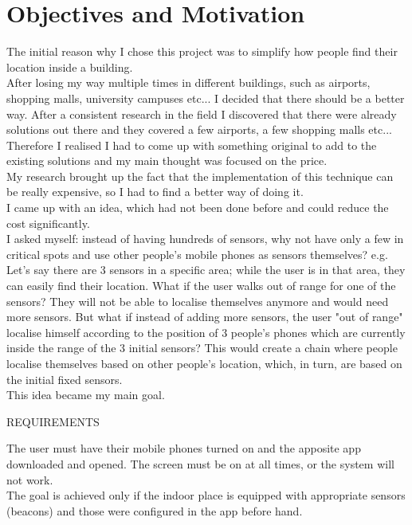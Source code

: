 \chapter{Objectives and Motivation}

The initial reason why I chose this project was to simplify how people find their location inside a building.\\
After losing my way multiple times in different buildings, such as airports, shopping malls, university campuses etc... I decided that there should be a better way. After a consistent research in the field I discovered that there were already solutions out there and they covered a few airports, a few shopping malls etc... Therefore I realised I had to come up with something original to add to the existing solutions and my main thought was focused on the price.\\
My research brought up the fact that the implementation of this technique can be really expensive, so I had to find a better way of doing it.\\
I came up with an idea, which had not been done before and could reduce the cost significantly.\\
I asked myself: instead of having hundreds of sensors, why not have only a few in critical spots and use other people's mobile phones as sensors themselves? e.g. Let's say there are 3 sensors in a specific area; while the user is in that area, they can easily find their location. What if the user walks out of range for one of the sensors? They will not be able to localise themselves anymore and would need more sensors. But what if instead of adding more sensors, the user "out of range" localise himself according to the position of 3 people's phones which are currently inside the range of the 3 initial sensors? This would create a chain where people localise themselves based on other people's location, which, in turn, are based on the initial fixed sensors.\\
This idea became my main goal.\\

\begin{center}
	REQUIREMENTS
\end{center}
The user must have their mobile phones turned on and the apposite app downloaded and opened. The screen must be on at all times, or the system will not work. \\
The goal is achieved only if the indoor place is equipped with appropriate sensors (beacons) and those were configured in the app before hand.

